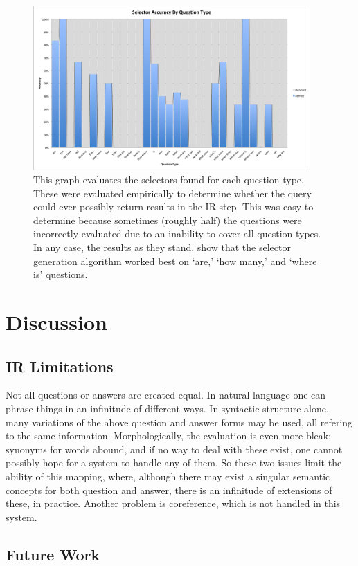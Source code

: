 \documentclass[twoside]{article}
\begin{document}
\begin{figure}[hb]
\centering
\caption{This graph evaluates the selectors found for each question type.  These were evaluated empirically to determine whether the query could ever possibly return results in the IR step.  This was easy to determine because sometimes (roughly half) the questions were incorrectly evaluated due to an inability to cover all question types.  In any case, the results as they stand, show that the selector generation algorithm worked best on `are,' `how many,' and `where is' questions.
\label{fig:result1}}
\includegraphics[width=400px]{figures/selector-accuracy.png}
\end{figure}

\section{Discussion}

\subsection{IR Limitations}

Not all questions or answers are created equal.  In natural language one can phrase things in an infinitude of different ways.  In syntactic structure alone, many variations of the above question and answer forms may be used, all refering to the same information. Morphologically, the evaluation is even more bleak; synonyms for words abound, and if no way to deal with these exist, one cannot possibly hope for a system to handle any of them.  So these two issues limit the ability of this mapping, where, although there may exist a singular semantic concepts for both question and answer, there is an infinitude of extensions of these, in practice.  Another problem is coreference, which is not handled in this system.

\subsection{Future Work}
\end{document}

